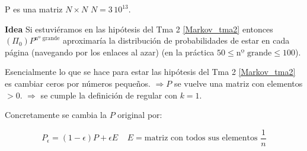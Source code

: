 P es una matriz $N \times N$ $N = 3 \, 10^{13}$.

\textbf{Idea} Si estuviéramos en las hipótesis del Tma 2 \ref{Markov_tma2} entonces  $(\Pi_0) P^{\text{nº grande}}$ aproximaría la distribución de probabilidades de estar en cada página (navegando por los enlaces al azar) (en la práctica $50 \leq \text{nº grande} \leq 100$).


Esencialmente lo que se hace para estar las hipótesis del Tma 2 \ref{Markov_tma2} es cambiar ceros por números pequeños.
$\Rightarrow P$ se vuelve una matriz con elementos $> 0$.
$\Rightarrow$ se cumple la definición de regular con $k=1$.

Concretamente se cambia la $P$ original por:

$$P_{\epsilon} = (1-\epsilon) P + \epsilon E \;\;\;\; E = \text{matriz con todos sus elementos } \frac{1}{n}$$

